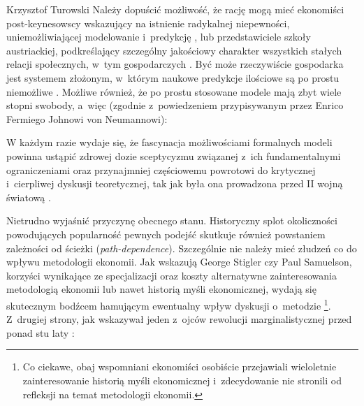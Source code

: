 \begin{artplenv}{Krzysztof Turowski}
Należy dopuścić możliwość, że rację mogą mieć ekonomiści post-keynesowscy wskazujący na istnienie radykalnej
niepewności, uniemożliwiającej modelowanie i~predykcję
\parencite{davidson_keynes_2009},
lub przedstawiciele
szkoły austriackiej, podkreślający szczególny jakościowy charakter wszystkich stałych relacji społecznych, w~tym
gospodarczych
\parencite{mises_ludzkie_2007}.
Być może rzeczywiście gospodarka jest systemem złożonym, w~którym
naukowe predykcje ilościowe są po prostu niemożliwe
\parencite{hayek_theory_1964}.
Możliwe również, że po
prostu stosowane modele mają zbyt wiele stopni swobody, a~więc (zgodnie z~powiedzeniem przypisywanym przez Enrico
Fermiego Johnowi von Neumannowi):


W każdym razie wydaje się, że fascynacja możliwościami formalnych modeli powinna ustąpić zdrowej dozie sceptycyzmu
związanej z~ich fundamentalnymi ograniczeniami oraz przynajmniej częściowemu powrotowi do krytycznej i~cierpliwej
dyskusji teoretycznej, tak jak była ona prowadzona przed II wojną światową
\parencite{blaug_formalist_2003}.

Nietrudno wyjaśnić przyczynę obecnego stanu. Historyczny splot okoliczności powodujących popularność pewnych podejść
skutkuje również powstaniem zależności od ścieżki (\textit{path-dependence}). Szczególnie nie należy mieć złudzeń co do
wpływu metodologii ekonomii. Jak wskazują George Stigler czy Paul Samuelson, korzyści wynikające ze specjalizacji oraz
koszty alternatywne zainteresowania metodologią ekonomii lub nawet historią myśli ekonomicznej, wydają się skutecznym
bodźcem hamującym ewentualny wpływ dyskusji o~metodzie
\parencite{samuelson_out_1987,stigler_does_1969}\footnote{Co ciekawe, obaj wspomniani ekonomiści osobiście przejawiali wieloletnie zainteresowanie historią myśli
ekonomicznej i~zdecydowanie nie stronili od refleksji na temat metodologii ekonomii.}. Z~drugiej strony, jak wskazywał
jeden z~ojców rewolucji marginalistycznej przed ponad stu laty
\parencite{menger_investigations_1996}:


\end{artplenv}
